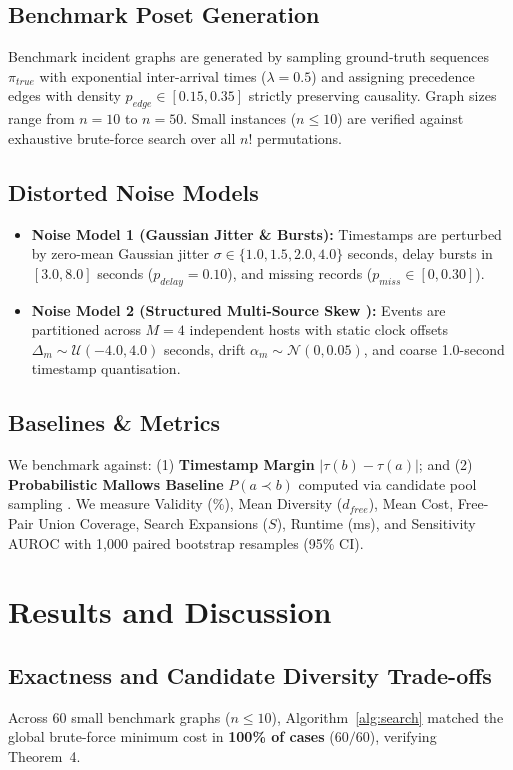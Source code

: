 \documentclass[journal]{IEEEtran}
\begin{document}
\subsection{Benchmark Poset Generation}
Benchmark incident graphs are generated by sampling ground-truth sequences $\pi_{true}$ with exponential inter-arrival times ($\lambda = 0.5$) and assigning precedence edges with density $p_{edge} \in [0.15, 0.35]$ strictly preserving causality. Graph sizes range from $n = 10$ to $n = 50$. Small instances ($n \le 10$) are verified against exhaustive brute-force search over all $n!$ permutations.

\subsection{Distorted Noise Models}
\begin{itemize}
    \item \textbf{Noise Model 1 (Gaussian Jitter \& Bursts):} Timestamps are perturbed by zero-mean Gaussian jitter $\sigma \in \{1.0, 1.5, 2.0, 4.0\}$ seconds, delay bursts in $[3.0, 8.0]$ seconds ($p_{delay} = 0.10$), and missing records ($p_{miss} \in [0, 0.30]$).
    \item \textbf{Noise Model 2 (Structured Multi-Source Skew \cite{Kimm2026}):} Events are partitioned across $M = 4$ independent hosts with static clock offsets $\Delta_m \sim \mathcal{U}(-4.0, 4.0)$ seconds, drift $\alpha_m \sim \mathcal{N}(0, 0.05)$, and coarse 1.0-second timestamp quantisation.
\end{itemize}

\subsection{Baselines \& Metrics}
We benchmark against: (1) \textbf{Timestamp Margin} $|\tau(b) - \tau(a)|$; and (2) \textbf{Probabilistic Mallows Baseline} $P(a \prec b)$ computed via candidate pool sampling \cite{vanderAa2020}. We measure Validity (\%), Mean Diversity ($d_{free}$), Mean Cost, Free-Pair Union Coverage, Search Expansions ($S$), Runtime (ms), and Sensitivity AUROC with 1,000 paired bootstrap resamples (95\% CI).

\section{Results and Discussion}
\label{sec:results}

\subsection{Exactness and Candidate Diversity Trade-offs}
Across 60 small benchmark graphs ($n \le 10$), Algorithm~\ref{alg:search} matched the global brute-force minimum cost in \textbf{100\% of cases} ($60/60$), verifying Theorem~4.
\end{document}
